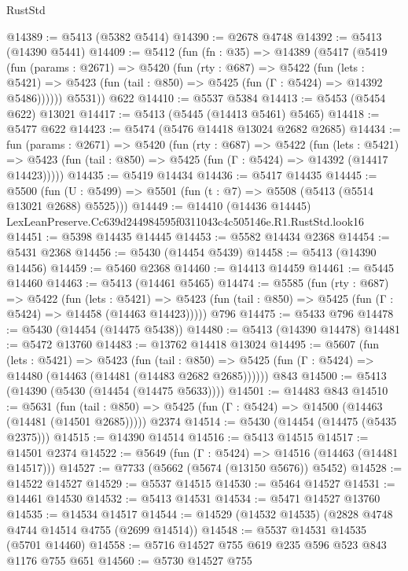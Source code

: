 \begin{lexlean}{RustStd}
\begin{coremodule}
@14389 := @5413 (@5382 @5414)
@14390 := @2678 @4748
@14392 := @5413 (@14390 @5441)
@14409 := @5412
    (fun (fn : @35) =>
    @14389
      (@5417
        (@5419
          (fun (params : @2671) =>
          @5420
            (fun (rty : @687) =>
            @5422
              (fun (lets : @5421) =>
              @5423 (fun (tail : @850) => @5425 (fun (Γ : @5424) => @14392 @5486))))))
        @5531))
    @622
@14410 := @5537 @5384
@14413 := @5453 (@5454 @622) @13021
@14417 := @5413 (@5445 (@14413 @5461) @5465)
@14418 := @5477 @622
@14423 := @5474 (@5476 @14418 @13024 @2682 @2685)
@14434 := fun (params : @2671) =>
  @5420
    (fun (rty : @687) =>
    @5422
      (fun (lets : @5421) =>
      @5423 (fun (tail : @850) => @5425 (fun (Γ : @5424) => @14392 (@14417 @14423)))))
@14435 := @5419 @14434
@14436 := @5417 @14435
@14445 := @5500
    (fun (U : @5499) => @5501 (fun (t : @7) => @5508 (@5413 (@5514 @13021 @2688) @5525)))
@14449 := @14410 (@14436 @14445) LexLeanPreserve.Cc639d244984595f0311043c4c505146e.R1.RustStd.look16
@14451 := @5398 @14435 @14445
@14453 := @5582 @14434 @2368
@14454 := @5431 @2368
@14456 := @5430 (@14454 @5439)
@14458 := @5413 (@14390 @14456)
@14459 := @5460 @2368
@14460 := @14413 @14459
@14461 := @5445 @14460
@14463 := @5413 (@14461 @5465)
@14474 := @5585
    (fun (rty : @687) =>
    @5422
      (fun (lets : @5421) =>
      @5423 (fun (tail : @850) => @5425 (fun (Γ : @5424) => @14458 (@14463 @14423)))))
    @796
@14475 := @5433 @796
@14478 := @5430 (@14454 (@14475 @5438))
@14480 := @5413 (@14390 @14478)
@14481 := @5472 @13760
@14483 := @13762 @14418 @13024
@14495 := @5607
    (fun (lets : @5421) =>
    @5423
      (fun (tail : @850) =>
      @5425 (fun (Γ : @5424) => @14480 (@14463 (@14481 (@14483 @2682 @2685))))))
    @843
@14500 := @5413 (@14390 (@5430 (@14454 (@14475 @5633))))
@14501 := @14483 @843
@14510 := @5631
    (fun (tail : @850) => @5425 (fun (Γ : @5424) => @14500 (@14463 (@14481 (@14501 @2685)))))
    @2374
@14514 := @5430 (@14454 (@14475 (@5435 @2375)))
@14515 := @14390 @14514
@14516 := @5413 @14515
@14517 := @14501 @2374
@14522 := @5649 (fun (Γ : @5424) => @14516 (@14463 (@14481 @14517)))
@14527 := @7733 (@5662 (@5674 (@13150 @5676)) @5452)
@14528 := @14522 @14527
@14529 := @5537 @14515
@14530 := @5464 @14527
@14531 := @14461 @14530
@14532 := @5413 @14531
@14534 := @5471 @14527 @13760
@14535 := @14534 @14517
@14544 := @14529 (@14532 @14535) (@2828 @4748 @4744 @14514 @4755 (@2699 @14514))
@14548 := @5537 @14531 @14535 (@5701 @14460)
@14558 := @5716 @14527 @755 @619 @235 @596 @523 @843 @1176 @755 @651
@14560 := @5730 @14527 @755

\end{coremodule}
\end{lexlean}
